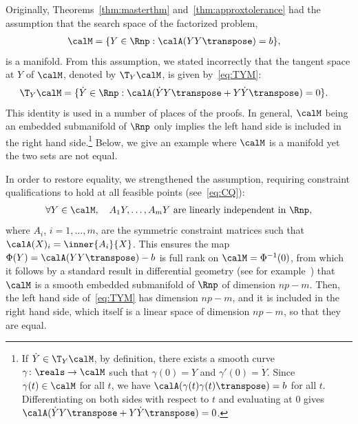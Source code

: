 \documentclass{article}
\newcommand{\1}{\mathbf{1}}
\begin{document}
Originally, Theorems~\ref{thm:masterthm} and~\ref{thm:approxtolerance} had the assumption that the search space of the factorized problem,
\begin{align*}
\calM & = \{ Y \in \Rnp : \calA(YY\transpose) = b \},
\end{align*}
is a manifold. From this assumption, we stated incorrectly that the tangent space at $Y$ of $\calM$, denoted by $\T_Y\calM$, is given by~\eqref{eq:TYM}:
\begin{align*}
\T_Y\calM & = \{ \dot Y \in \Rnp : \calA(\dot Y Y\transpose + Y \dot Y\transpose) = 0 \}.
\end{align*}
This identity is used in a number of places of the proofs. In general, $\calM$ being an embedded submanifold of $\Rnp$ only implies the left hand side is included in the right hand side.\footnote{If $\dot Y \in \T_Y\calM$, by definition, there exists a smooth curve $\gamma \colon \reals \to \calM$ such that $\gamma(0) = Y$ and $\gamma'(0) = \dot Y$. Since $\gamma(t) \in \calM$ for all $t$, we have $\calA(\gamma(t)\gamma(t)\transpose) = b$ for all $t$. Differentiating on both sides with respect to $t$ and evaluating at $0$ gives $\calA(\dot YY\transpose + Y\dot Y\transpose) = 0$.} Below, we give an example where $\calM$ is a manifold yet the two sets are not equal.

In order to restore equality, we strengthened the assumption, requiring constraint qualifications to hold at all feasible points (see~\eqref{eq:CQ}):
\begin{align*}
\forall Y \in \calM, \quad A_1Y, \ldots, A_mY \textrm{ are linearly independent in } \Rnp,
\end{align*}
where $A_i$, $i = 1, \ldots, m$, are the symmetric constraint matrices such that $\calA(X)_i = \inner{A_i}{X}$. This ensures the map $\Phi(Y) = \calA(YY\transpose) - b$ is full rank on $\calM = \Phi^{-1}(0)$, from which it follows by a standard result in differential geometry (see for example~\citep[Cor.~5.14]{lee2012smoothmanifolds}) that $\calM$ is a smooth embedded submanifold of $\Rnp$ of dimension $np - m$. Then, the left hand side of~\eqref{eq:TYM} has dimension $np - m$, and it is included in the right hand side, which itself is a linear space of dimension $np - m$, so that they are equal.

\end{document}
